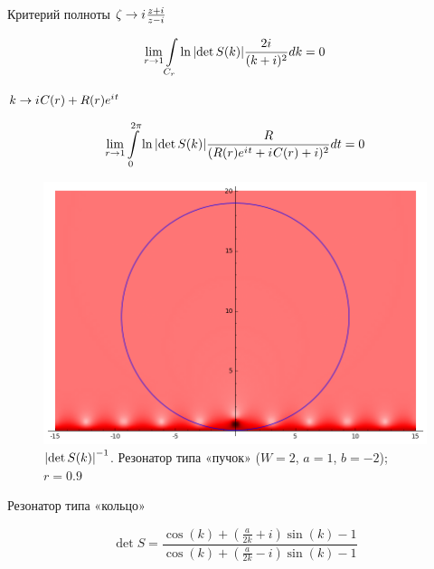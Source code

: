 \documentclass{beamer}
\begin{document}
\begin{frame}{Критерий полноты}
$\zeta \to \iu \frac{z + \iu}{z - \iu}$

\[
\lim\limits_{r \to 1} \int\limits_{C_r} \ln \abs{\det S(k)} \frac{2 \iu}{(k + i)^2} dk = 0
\]

$k \to \iu C(r) + R(r) \eexp{\iu t}$

\[
\lim\limits_{r \to 1} \int\limits_{0}^{2 \pi} \ln \abs{\det S(k)} \frac{R}{(R(r) \eexp{\iu t} + \iu C(r) + i)^2} dt = 0
\]
\end{frame}



\begin{frame}[plain]
\begin{figure}
\includegraphics[width=\textwidth,height=\textheight,keepaspectratio]{pic/contour_white.png}
{\caption{$\abs{\det S(k)}^{-1}$. Резонатор типа «пучок» ($W = 2$, $a = 1$, $b = -2$); $r = 0.9$}}
\end{figure}
\end{frame}


\begin{frame}{Резонатор типа «кольцо»}

\begin{figure}
\begin{tikzpicture}[scale=0.8]

\end{tikzpicture}
\end{figure}

\[
\det S = 
\frac
{\cos\left(k\right) + {\left(\frac{a}{2 k} + i\right)} \sin\left(k\right) - 1}
{\cos\left(k\right) + {\left(\frac{a}{2 k} - i\right)} \sin\left(k\right) - 1}
\]

\end{frame}
\end{document}
